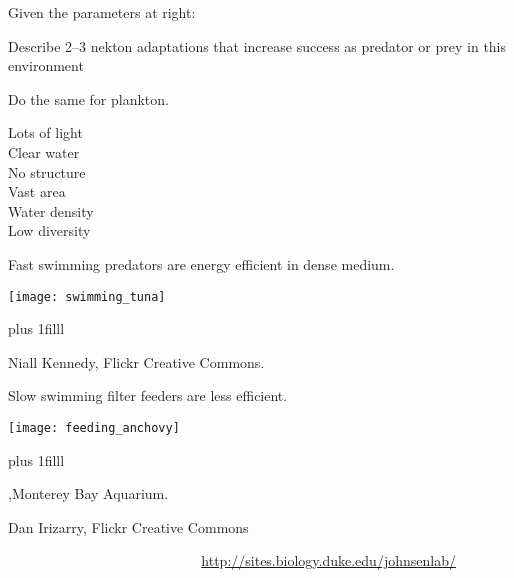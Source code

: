\documentclass[t,handout]{beamer}  %
\begin{document}
\begin{frame}[t]{Given the parameters at right:}
	\begin{multicols}{2}
		\hangpara Describe 2–3 nekton adaptations that increase success as predator or prey in this environment

		\hangpara Do the same for plankton.
	\columnbreak
	
		Lots of light\\
		Clear water\\
		No structure\\
		Vast area\\
		Water density\\
		Low diversity
	\end{multicols}

\end{frame}

\begin{frame}[t]{Fast swimming predators are energy efficient in dense medium.}

	\texttt{[image: swimming\_tuna]}

	\vskip0pt plus 1filll

	\tiny Niall Kennedy, Flickr Creative Commons.
\end{frame}

\begin{frame}[t]{Slow swimming filter feeders are less efficient.}

	\texttt{[image: feeding\_anchovy]}

	\vskip0pt plus 1filll

	\tiny \textcopyright,Monterey Bay Aquarium.
\end{frame}


{
\begin{frame}[b]
\tiny Dan Irizarry, Flickr Creative Commons
\end{frame}
}

{
\begin{frame}[b]
\tiny\textcolor{white}{Johnson Lab, Duke University, \url{http://sites.biology.duke.edu/johnsenlab/}}
\end{frame}
}
\end{document}
